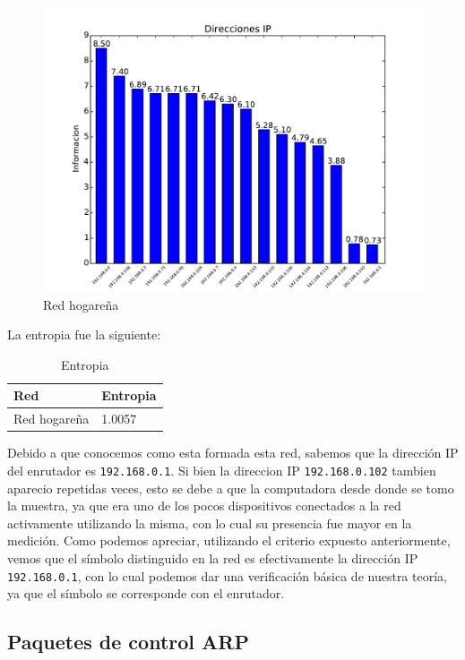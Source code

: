 \begin{figure}[H]
\begin{center}
\includegraphics[width=0.8\columnwidth]{graficos/hogar_inf_s2.pdf}
\caption{Red hogareña}
\end{center}
\end{figure}

La entropia fue la siguiente:

\begin{table}[H]
\centering
\caption{Entropia}
\label{my-label}
\begin{tabular}{ll}
\hline
Red         & Entropia \\ \hline
Red hogareña & 1.0057   \\
\end{tabular}
\end{table}

Debido a que conocemos como esta formada esta red, sabemos que la dirección IP del enrutador es \texttt{192.168.0.1}. Si bien la direccion IP \texttt{192.168.0.102} tambien aparecio repetidas veces, esto se debe a que la computadora desde donde se tomo la muestra, ya que era uno de los pocos dispositivos conectados a la red activamente utilizando la misma, con lo cual su presencia fue mayor en la medición. Como podemos apreciar, utilizando el criterio expuesto anteriormente, vemos que el símbolo distinguido en la red es efectivamente la dirección IP \texttt{192.168.0.1}, con lo cual podemos dar una verificación básica de nuestra teoría, ya que el símbolo se corresponde con el enrutador.

\subsection{Paquetes de control ARP}


